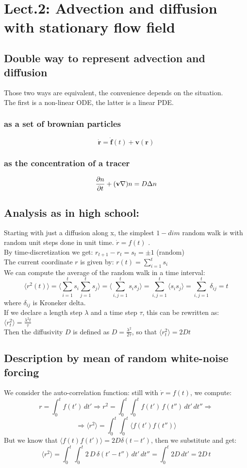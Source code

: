 \documentclass[a4paper,11pt]{article}
\newcommand{\RA}{\Rightarrow}
\newcommand{\cic}[1]{\mathbf{#1}}
\newcommand{\avg}[1]{\langle #1 \rangle}
\begin{document}
\newpage
	\section{Lect.2: Advection and diffusion with stationary flow field}
	
\subsection{Double way to represent advection and diffusion}
Those two ways are equivalent, the convenience depends on the situation.\\
The first is a non-linear ODE, the latter is a linear PDE.
		\subsubsection{as a set of brownian particles}
\[ \dot{\cic{r}}=\dot{\cic{f}}(t)+\cic{v}(\cic{r}) \]
		\subsubsection{as the concentration of a tracer}
\[  \pdv{n}{t}+(\cic{v}\nabla)n=D \Delta n \]

\subsection{Analysis as in high school:}
Starting with just a diffusion along x, the simplest $1-dim$ random walk is with random unit steps done in unit time. $\dot{r}=f(t)$ . \\
By time-discretization we get: $r_{t+1}-r_{t}=s_t=\pm 1  $ (random) \\
The current coordinate $r$ is given by:  $r(t)=\sum_{i=1}^{t}s_i$    	\\
We can compute the average of the random walk in a time interval:
\[ \avg{ r^2(t)}= \avg{\sum_{i=1}^{t}s_i \sum_{j=1}^{t}s_j}=\avg{\sum_{i,j=1}^{t}s_i s_j}= \sum_{i,j=1}^{t}\avg{ s_i s_j}= \sum_{i,j=1}^{t} \delta_{ij}=t   \]
where $\delta_{ij}$ is Kroneker delta.\\
If we declare a length step $\lambda$ and a time step $\tau$, this can be rewritten as: $\avg{ r_t^2}=\frac{\lambda^2 t}{\tau}$ \\
Then the diffusivity $D$ is defined as $D=\frac{\lambda^2}{2 \tau}$, so that $\avg{ r_t^2}=2Dt$\\

\subsection{Description by mean of random white-noise forcing}
We consider the auto-correlation function: still with $\dot{r}=f(t)$, we compute:
\[  r=\int_{0}^{t} f(t')\,dt' \RA r^2=\int_{0}^{t} \int_{0}^{t} f(t')\,f(t'')\,dt'\,dt'' \RA  \]
\[   \RA \avg{ r^2}=\int_{0}^{t}\int_{0}^{t} \avg{ f(t')f(t'')}    \]
But we know that $\avg{ f(t)f(t')}=2D \delta (t-t')$, then we substitute and get:
\[ \avg{ r^2}=\int_{0}^{t}\int_{0}^{t}2\,D\, \delta(t'-t'')\,dt'\,dt''= \int_{0}^{t} 2D\,dt'=2D\,t\]
\end{document}
